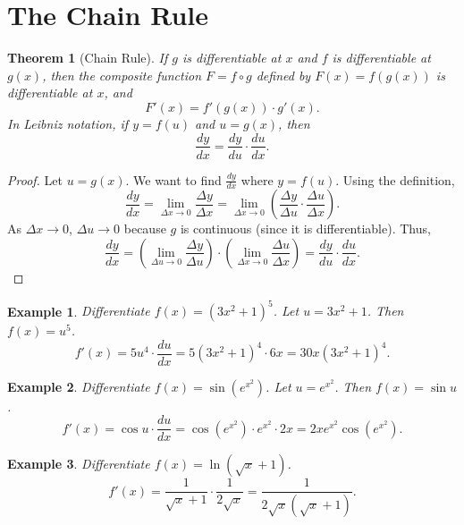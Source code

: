 \documentclass[11pt,a4paper]{article}
\newtheorem{example}{Example}
\newtheorem{theorem}{Theorem}
\begin{document}
\section{The Chain Rule}
\begin{theorem}[Chain Rule]
If $g$ is differentiable at $x$ and $f$ is differentiable at $g(x)$, then the composite function $F = f \circ g$ defined by $F(x) = f(g(x))$ is differentiable at $x$, and
\[
F'(x) = f'(g(x)) \cdot g'(x).
\]
In Leibniz notation, if $y = f(u)$ and $u = g(x)$, then
\[
\frac{dy}{dx} = \frac{dy}{du} \cdot \frac{du}{dx}.
\]
\end{theorem}
\begin{proof}
Let $u = g(x)$. We want to find $\frac{dy}{dx}$ where $y = f(u)$. Using the definition,
\[
\frac{dy}{dx} = \lim_{\Delta x \to 0} \frac{\Delta y}{\Delta x} = \lim_{\Delta x \to 0} \left( \frac{\Delta y}{\Delta u} \cdot \frac{\Delta u}{\Delta x} \right).
\]
As $\Delta x \to 0$, $\Delta u \to 0$ because $g$ is continuous (since it is differentiable). Thus,
\[
\frac{dy}{dx} = \left( \lim_{\Delta u \to 0} \frac{\Delta y}{\Delta u} \right) \cdot \left( \lim_{\Delta x \to 0} \frac{\Delta u}{\Delta x} \right) = \frac{dy}{du} \cdot \frac{du}{dx}.
\]
\end{proof}
\begin{example}
Differentiate $f(x) = (3x^2 + 1)^5$.
Let $u = 3x^2 + 1$. Then $f(x) = u^5$.
\[
f'(x) = 5u^4 \cdot \frac{du}{dx} = 5(3x^2 + 1)^4 \cdot 6x = 30x(3x^2 + 1)^4.
\]
\end{example}
\begin{example}
Differentiate $f(x) = \sin(e^{x^2})$.
Let $u = e^{x^2}$. Then $f(x) = \sin u$.
\[
f'(x) = \cos u \cdot \frac{du}{dx} = \cos(e^{x^2}) \cdot e^{x^2} \cdot 2x = 2x e^{x^2} \cos(e^{x^2}).
\]
\end{example}
\begin{example}
Differentiate $f(x) = \ln(\sqrt{x} + 1)$.
\[
f'(x) = \frac{1}{\sqrt{x} + 1} \cdot \frac{1}{2\sqrt{x}} = \frac{1}{2\sqrt{x}(\sqrt{x} + 1)}.
\]
\end{example}
\end{document}

